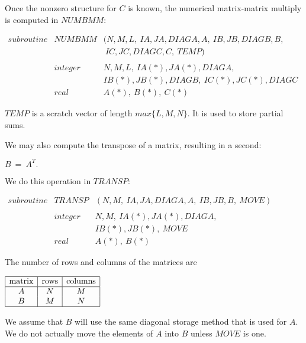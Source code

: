 Once the nonzero structure for $C$ is known, the numerical matrix-matrix
multiply is computed in $NUMBMM$:
\begin{center}
$\begin{array}{lll}
subroutine & NUMBMM  & (N,M,L,\ IA,JA,DIAGA,A,\ IB,JB,DIAGB,B,\\
           &         & \ IC,JC,DIAGC,C,\ TEMP)\\
           &         & \\
           & integer & N,M,L,\ IA(*),JA(*),DIAGA,\\
           &         & IB(*),JB(*),DIAGB,\ IC(*),JC(*),DIAGC\\
           & real    & A(*),\ B(*),\ C(*)
\end{array}$
\end{center}
$TEMP$ is a scratch vector of length $max\{L,M,N\}$.  It is used to
store partial sums.
 
We may also compute the transpose of a matrix, resulting in a second:
\begin{center}
$B\ =\ A^{T}.$
\end{center}
We do this operation in $TRANSP$:
\begin{center}
$\begin{array}{lll}
subroutine & TRANSP  & (N,M,\ IA,JA,DIAGA,A,\ IB,JB,B,\ MOVE)\\
           &         & \\
           & integer & N,M,\ IA(*),JA(*),DIAGA,\\
           &         & IB(*),JB(*),\ MOVE\\
           & real    & A(*),\ B(*)
\end{array}$
\end{center}
The number of rows and columns of the matrices are
\begin{center}
$\begin{array}{|c|c|c|}\hline
{\rm matrix} & {\rm rows} & {\rm columns} \\ \hline
A            & N          & M\\
B            & M          & N\\ \hline
\end{array}$
\end{center}
We assume that $B$ will use the same diagonal storage method that is used for
$A$.  We do not actually move the elements of $A$ into $B$ unless $MOVE$ is
one.
 
